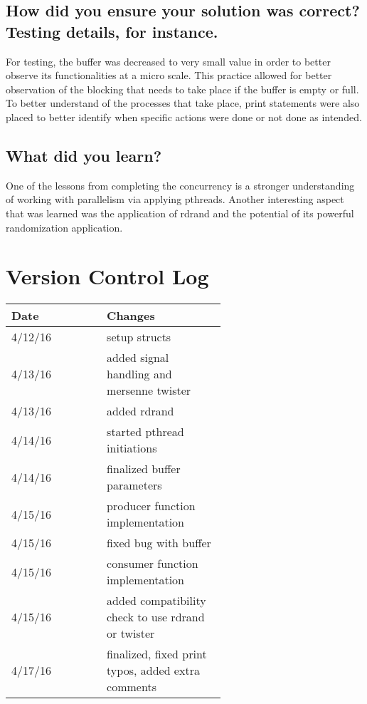 \documentclass[letterpaper,10pt,draftclsnofoot,onecolumn]{IEEEtran}
\begin{document}
\subsection{How did you ensure your solution was correct? Testing details, for instance.}
For testing, the buffer was decreased to very small value in order to better observe its functionalities at a micro scale. This practice allowed for 
better observation of the blocking that needs to take place if the buffer is empty or full. To better understand of the processes that take place,
print statements were also placed to better identify when specific actions were done or not done as intended.
\subsection{What did you learn?}
One of the lessons from completing the concurrency is a stronger understanding of working with parallelism via applying pthreads. Another 
interesting aspect that was learned was the application of rdrand and the potential of its powerful randomization application. 

\section{Version Control Log}
\begin{tabular}{|p{0.3\linewidth}|p{0.3\linewidth}|}
\hline
\textbf{Date}&\textbf{Changes}\\
\hline
4/12/16 & setup structs \\
\hline
4/13/16 & added signal handling and mersenne twister \\
\hline
4/13/16 & added rdrand \\
\hline
4/14/16 & started pthread initiations \\
\hline
4/14/16 & finalized buffer parameters \\
\hline
4/15/16 & producer function implementation \\
\hline
4/15/16 & fixed bug with buffer \\
\hline
4/15/16 & consumer function implementation \\
\hline
4/15/16 & added compatibility check to use rdrand or twister \\
\hline
4/17/16 & finalized, fixed print typos, added extra comments \\
\end{tabular}
\end{document}
